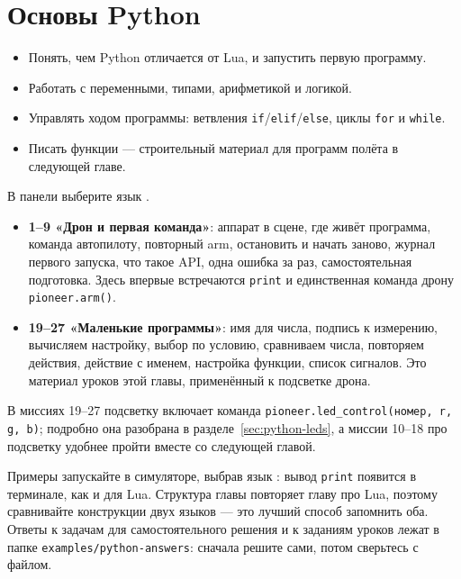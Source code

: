 \section{Основы Python}
\label{sec:python_programming}

\begin{infobox}
\begin{itemize}
    \item Понять, чем Python отличается от Lua, и запустить первую программу.
    \item Работать с переменными, типами, арифметикой и логикой.
    \item Управлять ходом программы: ветвления \texttt{if}/\texttt{elif}/\texttt{else}, циклы \texttt{for} и \texttt{while}.
    \item Писать функции --- строительный материал для программ полёта в следующей главе.
\end{itemize}
\end{infobox}

\begin{missionbox}
В панели  выберите язык .
\begin{itemize}
    \item \textbf{1--9 «Дрон и первая команда»}: аппарат в сцене, где живёт программа, команда автопилоту, повторный arm, остановить и начать заново, журнал первого запуска, что такое API, одна ошибка за раз, самостоятельная подготовка. Здесь впервые встречаются \verb|print| и единственная команда дрону \verb|pioneer.arm()|.
    \item \textbf{19--27 «Маленькие программы»}: имя для числа, подпись к измерению, вычисляем настройку, выбор по условию, сравниваем числа, повторяем действия, действие с именем, настройка функции, список сигналов. Это материал уроков этой главы, применённый к подсветке дрона.
\end{itemize}
В миссиях 19--27 подсветку включает команда \texttt{pioneer.led\_control(номер, r, g, b)}; подробно она разобрана в разделе~\ref{sec:python-leds}, а миссии 10--18 про подсветку удобнее пройти вместе со следующей главой.
\end{missionbox}

\begin{rulebox}
Примеры запускайте в симуляторе, выбрав язык : вывод \verb|print| появится в терминале, как и для Lua. Структура главы повторяет главу про Lua, поэтому сравнивайте конструкции двух языков --- это лучший способ запомнить оба. Ответы к задачам для самостоятельного решения и к заданиям уроков лежат в папке \texttt{examples/python-answers}: сначала решите сами, потом сверьтесь с файлом.
\end{rulebox}
